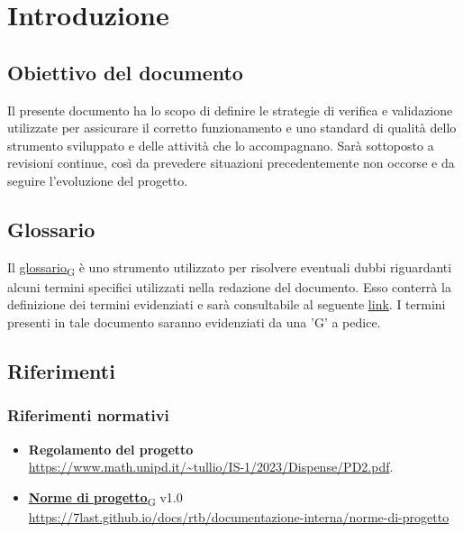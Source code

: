 \section{Introduzione}
\subsection{Obiettivo del documento}
Il presente documento ha lo scopo di definire le strategie di verifica e validazione utilizzate per assicurare il corretto funzionamento e uno standard di qualità dello strumento sviluppato e delle
attività che lo accompagnano.  Sarà sottoposto a revisioni continue, così da prevedere situazioni precedentemente non occorse e da seguire l'evoluzione del progetto.

\subsection{Glossario}
Il \href{https://7last.github.io/docs/rtb/documentazione-interna/glossario\#glossario}{glossario\textsubscript{G}} è uno strumento utilizzato per risolvere eventuali dubbi riguardanti
alcuni termini specifici utilizzati nella redazione del documento.
Esso conterrà la definizione dei termini evidenziati e sarà consultabile al seguente \underline{\href{https://7last.github.io/docs/rtb/documentazione-interna/glossario}{link}}. I termini presenti in tale documento saranno evidenziati da una 'G' a pedice.

\subsection{Riferimenti}
\subsubsection{Riferimenti normativi}
\begin{itemize}
    \item \textbf{Regolamento del progetto} \\
        \url{https://www.math.unipd.it/~tullio/IS-1/2023/Dispense/PD2.pdf}.
    \item \href{https://7last.github.io/docs/rtb/documentazione-interna/glossario\#norme-di-progetto}{\textbf{Norme di progetto}\textsubscript{G}} v1.0 \\
        \url{https://7last.github.io/docs/rtb/documentazione-interna/norme-di-progetto}
\end{itemize}
